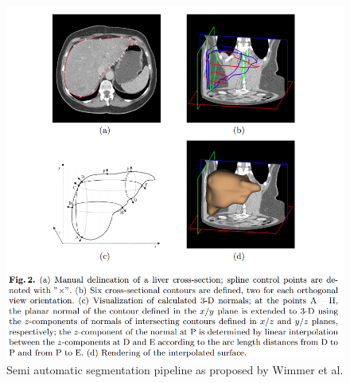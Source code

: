 \documentclass[]{article}
\begin{document}
\begin{figure} [ht!]
	\centering
	\includegraphics[width=0.7\linewidth]{images/image8}
	\caption{Semi automatic segmentation pipeline as proposed by Wimmer et al. \cite{Wimmer2007}}
	\label{Wimmer2007_Fig2}
\end{figure}
\end{document}
